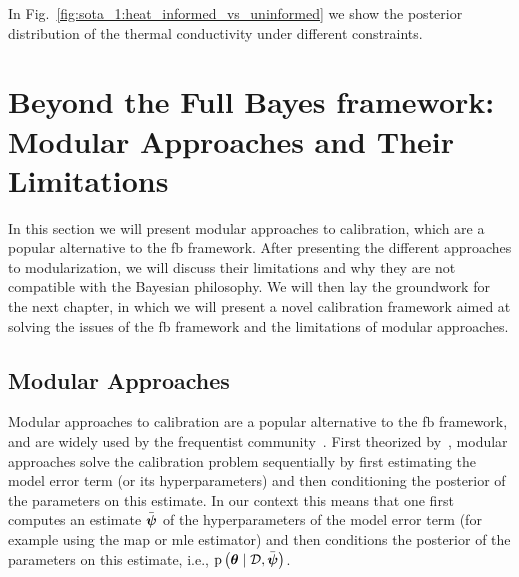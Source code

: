 In Fig.~\ref{fig:sota_1:heat_informed_vs_uninformed} we show the posterior distribution of the thermal conductivity under different constraints. 



\section{Beyond the Full Bayes framework: Modular Approaches and Their Limitations}
\label{sec:sota_1:modularization}

In this section we will present modular approaches to calibration, which are a popular alternative to the \gls{fb} framework. After presenting the different approaches to modularization, we will discuss their limitations and why they are not compatible with the Bayesian philosophy. We will then lay the groundwork for the next chapter, in which we will present a novel calibration framework aimed at solving the issues of the \gls{fb} framework and the limitations of modular approaches.

\subsection{Modular Approaches}

Modular approaches to calibration are a popular alternative to the \gls{fb} framework, and are widely used by the frequentist community~\cite{freq_calibration}. First theorized by~\cite{mod_approaches}, modular approaches solve the calibration problem sequentially by first estimating the model error term (or its hyperparameters) and then conditioning the posterior of the parameters on this estimate. In our context this means that one first computes an estimate $\bar{\boldsymbol{\psi}}$ of the hyperparameters of the model error term (for example using the \gls{map} or \gls{mle} estimator) and then conditions the posterior of the parameters on this estimate, i.e., $\mathrm{p} \left( \boldsymbol{\theta} \mid \mathcal{D}, \bar{\boldsymbol{\psi}} \right)$.

